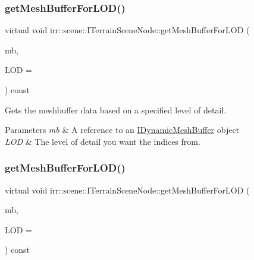 \subsubsection{\texorpdfstring{get\+Mesh\+Buffer\+For\+L\+O\+D()}{getMeshBufferForLOD()}\hspace{0.1cm}{\footnotesize\ttfamily [1/2]}}
{\footnotesize\ttfamily virtual void irr\+::scene\+::\+I\+Terrain\+Scene\+Node\+::get\+Mesh\+Buffer\+For\+L\+OD (\begin{DoxyParamCaption}\item[{\hyperlink{classirr_1_1scene_1_1IDynamicMeshBuffer}{I\+Dynamic\+Mesh\+Buffer} \&}]{mb,  }\item[{\hyperlink{namespaceirr_ac66849b7a6ed16e30ebede579f9b47c6}{s32}}]{L\+OD = {} }\end{DoxyParamCaption}) const\hspace{0.3cm}{\ttfamily [pure virtual]}}



Gets the meshbuffer data based on a specified level of detail. 


\begin{DoxyParams}{Parameters}
{\em mb} & A reference to an \hyperlink{classirr_1_1scene_1_1IDynamicMeshBuffer}{I\+Dynamic\+Mesh\+Buffer} object \\
\hline
{\em L\+OD} & The level of detail you want the indices from. \\
\hline
\end{DoxyParams}
\mbox{\label{classirr_1_1scene_1_1ITerrainSceneNode_ae23af8c2066da39ad10714dcf95dd8f1}} 
\subsubsection{\texorpdfstring{get\+Mesh\+Buffer\+For\+L\+O\+D()}{getMeshBufferForLOD()}\hspace{0.1cm}{\footnotesize\ttfamily [2/2]}}
{\footnotesize\ttfamily virtual void irr\+::scene\+::\+I\+Terrain\+Scene\+Node\+::get\+Mesh\+Buffer\+For\+L\+OD (\begin{DoxyParamCaption}\item[{\hyperlink{classirr_1_1scene_1_1IDynamicMeshBuffer}{I\+Dynamic\+Mesh\+Buffer} \&}]{mb,  }\item[{\hyperlink{namespaceirr_ac66849b7a6ed16e30ebede579f9b47c6}{s32}}]{L\+OD = {} }\end{DoxyParamCaption}) const\hspace{0.3cm}{\ttfamily [pure virtual]}}



